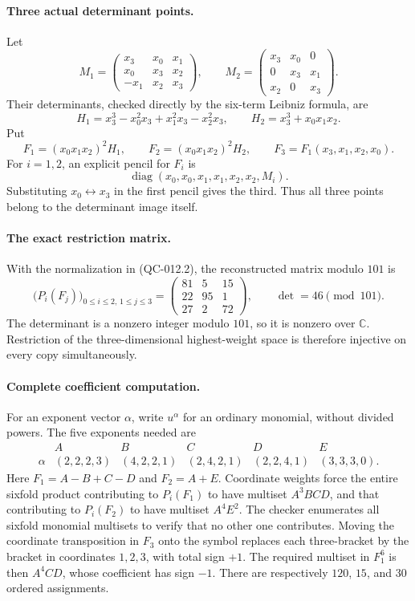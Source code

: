 \paragraph{Three actual determinant points.}
Let
\[
 M_1=\begin{pmatrix}
 x_3&x_0&x_1\\x_0&x_3&x_2\\-x_1&x_2&x_3
 \end{pmatrix},\qquad
 M_2=\begin{pmatrix}
 x_3&x_0&0\\0&x_3&x_1\\x_2&0&x_3
 \end{pmatrix}.
\]
Their determinants, checked directly by the six-term Leibniz formula,
are
\[
 H_1=x_3^3-x_0^2x_3+x_1^2x_3-x_2^2x_3,
 \qquad H_2=x_3^3+x_0x_1x_2.
\]
Put
\[
 F_1=(x_0x_1x_2)^2H_1,\qquad
 F_2=(x_0x_1x_2)^2H_2,\qquad
 F_3=F_1(x_3,x_1,x_2,x_0).
\]
For $i=1,2$, an explicit pencil for $F_i$ is
\[
       \operatorname{diag}(x_0,x_0,x_1,x_1,x_2,x_2,M_i).
\]
Substituting $x_0\leftrightarrow x_3$ in the first pencil gives the
third.  Thus all three points belong to the determinant image itself.

\paragraph{The exact restriction matrix.}
With the normalization in (QC-012.2), the reconstructed matrix modulo
$101$ is
\[
  \bigl(P_i(F_j)\bigr)_{0\leq i\leq2,\,1\leq j\leq3}
       =\begin{pmatrix}
          81&5&15\\22&95&1\\27&2&72
        \end{pmatrix},\qquad
       \det=46\pmod {101}.
       \tag{QC-012.3}
\]
The determinant is a nonzero integer modulo $101$, so it is nonzero
over $\mathbb C$.  Restriction of the three-dimensional highest-weight
space is therefore injective on every copy simultaneously.

\paragraph{Complete coefficient computation.}
For an exponent vector $\alpha$, write $u^\alpha$ for an ordinary
monomial, without divided powers.  The five exponents needed are
\[
 \begin{array}{c|ccccc}
       &A&B&C&D&E\\\hline
 \alpha&(2,2,2,3)&(4,2,2,1)&(2,4,2,1)&(2,2,4,1)&(3,3,3,0).
 \end{array}
\]
Here $F_1=A-B+C-D$ and $F_2=A+E$.  Coordinate weights force the
entire sixfold product contributing to $P_i(F_1)$ to have multiset
$A^3BCD$, and that contributing to $P_i(F_2)$ to have multiset
$A^4E^2$.  The checker enumerates all sixfold monomial multisets to
verify that no other one contributes.  Moving the coordinate
transposition in $F_3$ onto the symbol replaces each three-bracket by
the bracket in coordinates $1,2,3$, with total sign $+1$.  The required
multiset in $F_1^6$ is then $A^4CD$, whose coefficient has sign $-1$.
There are respectively $120$, $15$, and $30$ ordered assignments.

